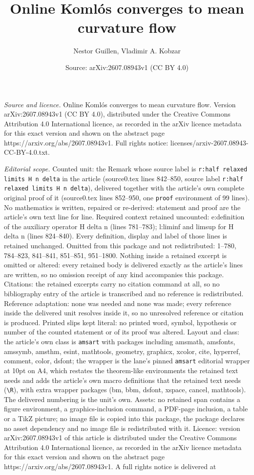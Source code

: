 \documentclass[10pt,a4paper]{amsart}
\title[Online Koml\'os converges to mean curvature flow]{Online Koml\'os converges to mean curvature flow}
\author{Nestor Guillen, Vladimir A. Kobzar}
\date{Source: arXiv:2607.08943v1 (CC BY 4.0)}
\begin{document}
\maketitle

\noindent\emph{Source and licence.} Online Koml\'os converges to mean curvature flow. Version arXiv:2607.08943v1 (CC BY 4.0), distributed under the Creative Commons Attribution 4.0 International licence, as recorded in the arXiv licence metadata for this exact version and shown on the abstract page https://arxiv.org/abs/2607.08943v1. Full rights notice: licenses/arxiv-2607.08943-CC-BY-4.0.txt.\par\smallskip

\noindent\textit{Editorial scope.} Counted unit: the Remark whose source label is \texttt{r:half relaxed limits H n delta} in the article (source0.tex lines 842--850, source label \texttt{r:half relaxed limits H n delta}), delivered together with the article's own complete original proof of it (source0.tex lines 852--950, one \texttt{proof} environment of 99 lines). No mathematics is written, repaired or re-derived: statement and proof are the article's own text line for line. Required context retained uncounted: e:definition of the auxiliary operator H delta n (lines 781--783); l:liminf and limsup for H delta n (lines 824--840). Every definition, display and label of those lines is retained unchanged. Omitted from this package and not redistributed: 1--780, 784--823, 841--841, 851--851, 951--1800. Nothing inside a retained excerpt is omitted or altered: every retained body is delivered exactly as the article's lines are written, so no omission receipt of any kind accompanies this package. Citations: the retained excerpts carry no citation command at all, so no bibliography entry of the article is transcribed and no reference is redistributed. Reference adaptation: none was needed and none was made; every reference inside the delivered unit resolves inside it, so no unresolved reference or citation is produced. Printed slips kept literal: no printed word, symbol, hypothesis or number of the counted statement or of its proof was altered. Layout and class: the article's own class is \texttt{amsart} with packages including amsmath, amsfonts, amssymb, amsthm, esint, mathtools, geometry, graphicx, xcolor, cite, hyperref, comment, color, dsfont; the wrapper is the lane's pinned \texttt{amsart} editorial wrapper at 10pt on A4, which restates the theorem-like environments the retained text needs and adds the article's own macro definitions that the retained text needs (\texttt{\textbackslash R}), with extra wrapper packages (bm, bbm, dsfont, xspace, cancel, mathtools). The delivered numbering is the unit's own. Assets: no retained span contains a figure environment, a graphics-inclusion command, a PDF-page inclusion, a table or a TikZ picture; no image file is copied into this package, the package declares no asset dependency and no image file is redistributed with it. Licence: version arXiv:2607.08943v1 of this article is distributed under the Creative Commons Attribution 4.0 International licence, as recorded in the arXiv licence metadata for this exact version and shown on the abstract page https://arxiv.org/abs/2607.08943v1. A full rights notice is delivered at 
\end{document}
